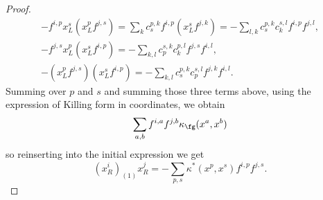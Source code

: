 \documentclass[a4paper, 10pt]{article}
\begin{document}
\begin{proof}
                \begin{gather*}
                    -f^{i,p}x^s_L(x^p_Lf^{j,s}) = \sum_k c^{p,k}_sf^{i,p}(x^s_Lf^{j,k}) = -\sum_{l, k} c^{p,k}_sc^{s, l}_kf^{i,p}f^{j,l}, \\
                    -f^{j, s}x^p_L(x^s_Lf^{i,p}) = -\sum_{k,l}c^{s,k}_pc^{p,l}_kf^{j,s}f^{i,l}, \\
                    -(x^p_Lf^{j,s})(x^s_Lf^{i,p}) = -\sum_{k, l}c^{p,k}_sc^{s,l}_pf^{j,k}f^{i,l}.
                \end{gather*}
                Summing over $p$ and $s$ and summing those three terms above, using the expression of Killing form in coordinates, we obtain \[\sum_{a, b} f^{i,a}f^{j, b}\kappa_{\fg}(x^a, x^b) \] so reinserting into the initial expression we get \[(x^i_R)_{(1)}x^j_R = -\sum_{p,s} \kappa^*(x^p, x^s) f^{i,p}f^{j,s}. \]


\end{proof}
\end{document}
